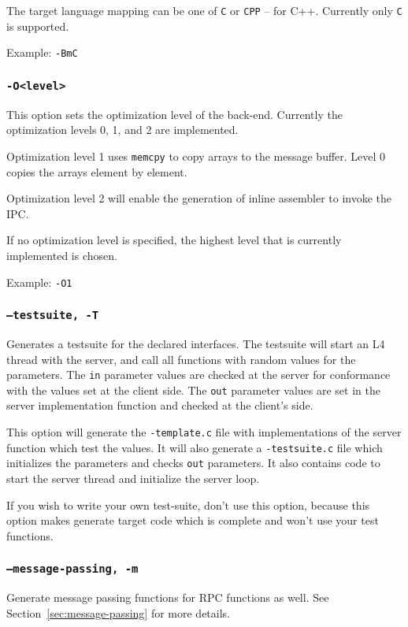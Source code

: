 The target language mapping can be one of {\tt C} or
{\tt CPP} -- for C++. Currently only {\tt C} is supported.

Example: \verb|-BmC|

\subsubsection{{\tt -O<level>}}
This option sets the optimization level of the back-end.
Currently the optimization levels 0, 1, and 2 are implemented.

Optimization level 1 uses \verb|memcpy| to copy arrays to
the message buffer. Level 0 copies the arrays element by element.

Optimization level 2 will enable the generation of inline assembler
to invoke the IPC.

If no optimization level is specified, the highest level that
is currently implemented is chosen.

Example: \verb|-O1|

\subsubsection{{\tt --testsuite, -T}}
Generates a testsuite for the declared interfaces. The testsuite
will start an L4 thread with the server, and call all functions
with random values for the parameters. The \verb|in| parameter
values are checked at the server for conformance with the values
set at the client side. The \verb|out| parameter values are set
in the server implementation function and checked at the client's
side.

This option will generate the \verb|-template.c| file with 
implementations of the server function which test the values.
It will also generate a \verb|-testsuite.c| file which initializes
the parameters and checks \verb|out| parameters. It also contains
code to start the server thread and initialize the server loop.

If you wish to write your own test-suite, don't use this
option, because this option makes \dice{} generate target
code which is complete and won't use your test functions.


\subsubsection{{\tt --message-passing, -m}}
Generate message passing functions for RPC functions as well.
See Section~\ref{sec:message-passing} for more details.


